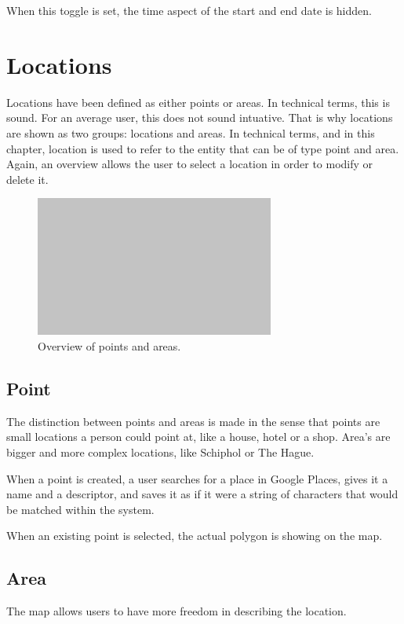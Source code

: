 When this toggle is set, the time aspect of the start and end date is hidden.

%
\section{Locations}
Locations have been defined as either points or areas. In technical terms, this is sound. For an average user, this does not sound intuative. That is why locations are shown as two groups: locations and areas. In technical terms, and in this chapter, location is used to refer to the entity that can be of type point and area. Again, an overview allows the user to select a location in order to modify or delete it.

\begin{figure}[H]
	\centering
	\includegraphics[width=0.7\textwidth]{Blank}
	\caption[Locations Overview]{Overview of points and areas.}
	\label{fig:Locations Overview}
\end{figure}

\subsection{Point}
The distinction between points and areas is made in the sense that points are small locations a person could point at, like a house, hotel or a shop. Area's are bigger and more complex locations, like Schiphol or The Hague.

When a point is created, a user searches for a place in Google Places, gives it a name and a descriptor, and saves it as if it were a string of characters that would be matched within the system.

When an existing point is selected, the actual polygon is showing on the map.

\subsection{Area}
The map allows users to have more freedom in describing the location.


